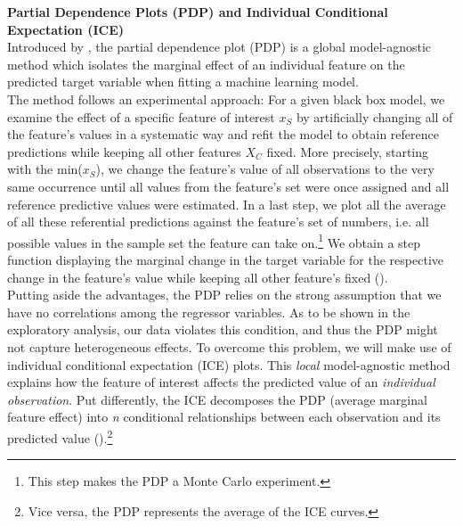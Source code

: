 \documentclass[12pt]{article}
\begin{document}
\noindent \textbf{Partial Dependence Plots (PDP) and Individual Conditional Expectation (ICE)}\\
Introduced by \cite{Friedman2001}, the partial dependence plot (PDP) is a global model-agnostic method which isolates the marginal effect of an individual feature on the predicted target variable when fitting a machine learning model. \\

\noindent The method follows an experimental approach: For a given black box model, we examine the effect of a specific feature of interest \(x_S\) by artificially changing all of the feature's values in a systematic way and refit the model to obtain reference predictions while keeping all other features \(X_C\) fixed. More precisely, starting with the min(\(x_S\)), we change the feature's value of all observations to the very same occurrence until all values from the feature's set were once assigned and all reference predictive values were estimated. In a last step, we plot all the average of all these referential predictions against the feature's set of numbers, i.e. all possible values in the sample set the feature can take on.\footnote{This step makes the PDP a Monte Carlo experiment.} We obtain a step function displaying the marginal change in the target variable for the respective change in the feature's value while keeping all other feature's fixed (\cite{molnar2023}).\\

\noindent Putting aside the advantages, the PDP relies on the strong assumption that we have no correlations among the regressor variables. As to be shown in the exploratory analysis, our data violates this condition, and thus the PDP might not capture heterogeneous effects. To overcome this problem, we will make use of individual conditional expectation (ICE) plots. This \textit{local} model-agnostic method explains how the feature of interest affects the predicted value of an \textit{individual observation}. Put differently, the ICE decomposes the PDP (average marginal feature effect) into \textit{n} conditional relationships between each observation and its predicted value (\cite{goldstein2014}).\footnote{Vice versa, the PDP represents the average of the ICE curves.}  \\
\end{document}
